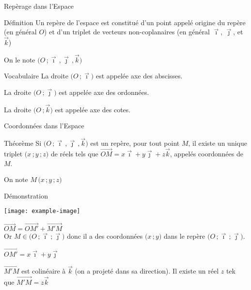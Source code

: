 \documentclass{cours}
\begin{document}
    \begin{Gpartie}{Repèrage dans l'Espace} 
        \begin{Spartie}{Définition} 
            Un repère de l'espace est constitué d'un point appelé origine du repère (en général $O$) et d'un triplet de vecteurs non-coplanaires (en général $\vec{\imath}$, $\vec{\jmath}$, et $\vec{k}$)

            On le note $\big(O\,;\vec{\imath}\,,\vec{\jmath}\,,\vec{k}\big)$
        \end{Spartie}
        \begin{Spartie}{Vocabulaire} 
            La droite $\big(O\,;\vec{\imath}\big)$ est appelée axe des abscisses.

            La droite $\big(O\,;\vec{\jmath}\big)$ est appelée axe des ordonnées.

            La droite $\big(O\,;\vec{k}\big)$ est appelée axe des cotes.
        \end{Spartie}
        \pagebreak
        \begin{Spartie}{Coordonnées dans l'Espace} 
            \begin{SSpartie}{Théorème} 
                Si $\big(O\,;\vec{\imath}\,,\vec{\jmath}\,,\vec{k}\big)$ est un repère, pour tout point $M$, il existe un unique triplet $\big(x\,;y\,;z\big)$ de réels tels que $\overrightarrow{OM}=x\vec{\imath}+y\vec{\jmath}+z\vec{k}$, appelés coordonnées de $M$.

                On note $M\,\big(x\,;y\,;z\big)$
                \begin{SSSpartie}{Démonstration} 
                    \begin{center}
                            \texttt{[image: example-image]}
                            \parbox{\linewidth}{}        
                    \end{center}
                    $\overrightarrow{OM}=\overrightarrow{OM'}+\overrightarrow{M'M}$ \\
                    Or $M\in\big(O\,;\vec{\imath}\,;\vec{\jmath}\big)$ donc il a des coordonnées $\big(x\,;y\big)$ dans le repère $(O\,;\vec{\imath}\,;\vec{\jmath}\big)$.

                    $\overrightarrow{OM'}=x\vec{\imath}+y\vec{\jmath}$

                    $\overrightarrow{M'M}$ est colinéaire à $\vec{k}$ (on a projeté dans sa direction). Il existe un réel $z$ tek que $\overrightarrow{M'M}=z\vec{k}$


\end{SSSpartie}
\end{SSpartie}
\end{Spartie}
\end{Gpartie}
\end{document}
